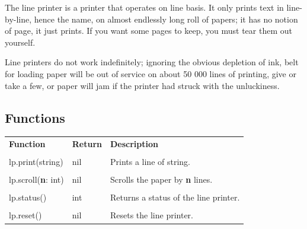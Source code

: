 \documentclass[10pt, stock]{memoir}
\begin{document}
The line printer is a printer that operates on line basis. It only prints text in line-by-line, hence the name, on almost endlessly long roll of papers; it has no notion of page, it just prints. If you want some pages to keep, you must tear them out yourself.

Line printers do not work indefinitely; ignoring the obvious depletion of ink, belt for loading paper will be out of service on about 50 000 lines of printing, give or take a few, or paper will jam if the printer had struck with the unluckiness.

\subsection{Functions}

\begin{tabularx}{\textwidth}{l l X}
	\textbf{\large Function} & \textbf{\large Return} & \textbf{\large Description}
	\\ \\
	\endhead
	lp.print(string) & nil & Prints a line of string.
	\\ \\
	lp.scroll(\textbf{n}: int) & nil & Scrolls the paper by \textbf{n} lines.
	\\ \\
	lp.status() & int & Returns a status of the line printer.
	\\ \\
	lp.reset() & nil & Resets the line printer.
\end{tabularx}

\afterpage{\pagestyle{empty}\null\newpage}
\end{document}
